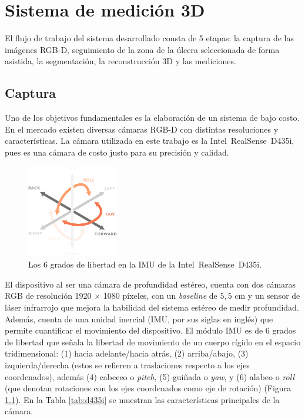 \chapter{Sistema de medición 3D}\label{chapter:proposal}

El flujo de trabajo del sistema desarrollado consta de 5 etapas: la captura de las imágenes RGB-D, seguimiento de la zona de la úlcera seleccionada de forma asistida, la segmentación, la reconstrucción 3D y las mediciones.

\section{Captura}

Uno de los objetivos fundamentales es la elaboración de un sistema de bajo costo. En el mercado existen diversas cámaras RGB-D con distintas resoluciones y características. La cámara utilizada en este trabajo es la Intel\textregistered~RealSense\texttrademark~D435i, pues es una cámara de costo justo para su precisión y calidad.

\begin{figure}[ht]
	\centering
	\includegraphics[width=4cm]{./Graphics/6dof.png}
	\caption{Los 6 grados de libertad en la IMU de la Intel\textregistered~RealSense\texttrademark~D435i.}
	\label{fig:6dof}
\end{figure}

El dispositivo al ser una cámara de profundidad estéreo, cuenta con dos cámaras RGB de resolución 1920 $\times$ 1080 píxeles, con un \textit{baseline} de $5,5$ cm y un sensor de láser infrarrojo que mejora la habilidad del sistema estéreo de medir profundidad. Además, cuenta de una unidad inercial (IMU, por sus siglas en inglés) que permite cuantificar el movimiento del dispositivo. El módulo IMU es de 6 grados de libertad que señala la libertad de movimiento de un cuerpo rígido en el espacio tridimensional: (1) hacia adelante/hacia atrás, (2) arriba/abajo, (3) izquierda/derecha (estos se refieren a traslaciones respecto a los ejes coordenados), además (4) cabeceo o \textit{pitch}, (5) guiñada o \textit{yaw}, y (6) alabeo o \textit{roll} (que denotan rotaciones con los ejes coordenados como eje de rotación) (Figura \ref{fig:6dof}). En la Tabla \ref{tab:d435i} se muestran las características principales de la cámara.

